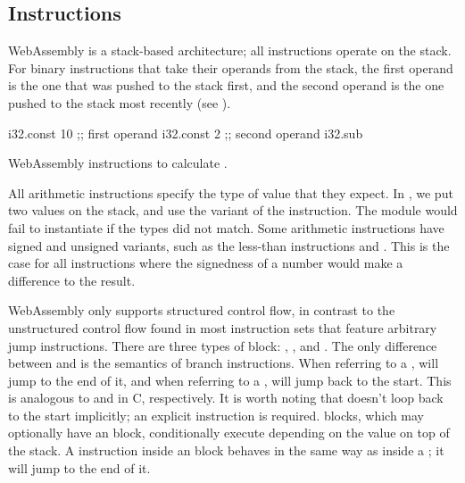 \documentclass[00-main.tex]{subfiles}
\begin{document}
\subsection{Instructions}

WebAssembly is a stack-based architecture; all instructions operate on the stack.
For binary instructions that take their operands from the stack, the first operand is the one that was pushed to the stack first, and the second operand is the one pushed to the stack most recently (see ).

\begin{listing}[ht]
  \begin{WasmListing}
    i32.const 10 ;; first operand
    i32.const 2  ;; second operand
    i32.sub
  \end{WasmListing}
  \caption{WebAssembly instructions to calculate .}
  \label{lst:wasm example sub instr}
\end{listing}

All arithmetic instructions specify the type of value that they expect. In , we put two  values on the stack, and use the  variant of the  instruction.
The module would fail to instantiate if the types did not match.
Some arithmetic instructions have signed and unsigned variants, such as the less-than instructions  and .
This is the case for all instructions where the signedness of a number would make a difference to the result.

WebAssembly only supports structured control flow, in contrast to the unstructured control flow found in most instruction sets that feature arbitrary jump instructions.
There are three types of block: , , and .
The only difference between  and  is the semantics of branch instructions.
When referring to a ,  will jump to the end of it, and when referring to a ,  will jump back to the start.
This is analogous to  and  in C, respectively.
It is worth noting that  doesn't loop back to the start implicitly; an explicit  instruction is required.
 blocks, which may optionally have an  block, conditionally execute depending on the value on top of the stack.
A  instruction inside an  block behaves in the same way as inside a ; it will jump to the end of it.
\end{document}
